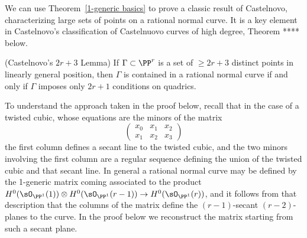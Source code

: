 We can use Theorem~\ref{1-generic basics} to prove a classic result of Castelnovo, characterizing large sets of 
points on a rational normal curve. It is a key element in Castelnovo's classification of Castelnuovo curves of high
degree, Theorem **** below.

\begin{corollary}(Castelnovo's $2r+3$ Lemma)\label{Castelnuovo2r+3}
If $\Gamma\subset \PP^r$ is a set of $\geq 2r+3$ distinct points in linearly general position, then
$\Gamma$ is contained in a rational normal curve if and only if $\Gamma$ imposes only $2r+1$
conditions on quadrics. 
\end{corollary}
 
 To understand the approach taken in the proof below, recall that in the case of a twisted
 cubic, whose equations are the minors of the matrix
 $$
\begin{pmatrix}
 x_0&x_1&x_2\\
 x_1&x_2&x_3
\end{pmatrix}
 $$
the first column defines a secant line to the twisted cubic, and the two minors involving the first column are a regular sequence defining the union of the twisted cubic and that secant line.
In general a rational normal curve may be defined by the 1-generic matrix coming associated to the product $H^0(\sO_{\PP^1}(1)) \otimes H^0(\sO_{\PP^1}(r-1)) \to H^0(\sO_{\PP^1}(r))$,
and it follows from that description that the columns of the matrix define the $(r-1)$-secant $(r-2)$-planes to the curve. In the proof below we reconstruct the matrix starting from such a secant plane.

